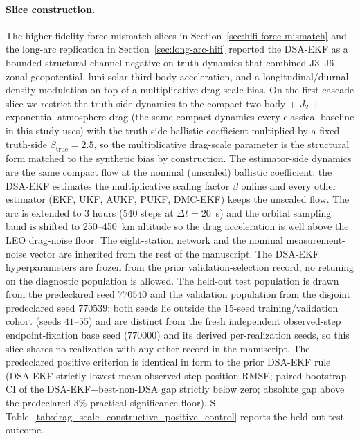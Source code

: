 \documentclass{article}
\begin{document}
\paragraph{Slice construction.}
The higher-fidelity force-mismatch slices in Section~\ref{sec:hifi-force-mismatch} and the long-arc replication in Section~\ref{sec:long-arc-hifi} reported the DSA-EKF as a bounded structural-channel negative on truth dynamics that combined J3--J6 zonal geopotential, luni-solar third-body acceleration, and a longitudinal/diurnal density modulation on top of a multiplicative drag-scale bias. On the first cascade slice we restrict the truth-side dynamics to the compact two-body + $J_2$ + exponential-atmosphere drag (the same compact dynamics every classical baseline in this study uses) with the truth-side ballistic coefficient multiplied by a fixed truth-side $\beta_{\mathrm{true}}=2.5$, so the multiplicative drag-scale parameter is the structural form matched to the synthetic bias by construction. The estimator-side dynamics are the same compact flow at the nominal (unscaled) ballistic coefficient; the DSA-EKF estimates the multiplicative scaling factor $\beta$ online and every other estimator (EKF, UKF, AUKF, PUKF, DMC-EKF) keeps the unscaled flow. The arc is extended to 3 hours (540 steps at $\Delta t = 20$~s) and the orbital sampling band is shifted to 250--450~km altitude so the drag acceleration is well above the LEO drag-noise floor. The eight-station network and the nominal measurement-noise vector are inherited from the rest of the manuscript. The DSA-EKF hyperparameters are frozen from the prior validation-selection record; no retuning on the diagnostic population is allowed. The held-out test population is drawn from the predeclared seed $770540$ and the validation population from the disjoint predeclared seed $770539$; both seeds lie outside the 15-seed training/validation cohort (seeds $41$--$55$) and are distinct from the fresh independent observed-step endpoint-fixation base seed ($770000$) and its derived per-realization seeds, so this slice shares no realization with any other record in the manuscript. The predeclared positive criterion is identical in form to the prior DSA-EKF rule (DSA-EKF strictly lowest mean observed-step position RMSE; paired-bootstrap CI of the DSA-EKF$-$best-non-DSA gap strictly below zero; absolute gap above the predeclared 3\% practical significance floor). S-Table~\ref{tab:drag_scale_constructive_positive_control} reports the held-out test outcome.


\end{document}
